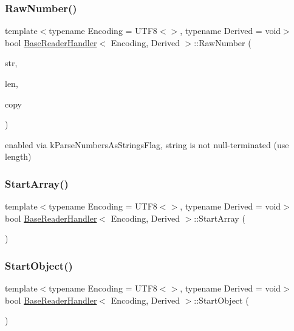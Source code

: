 \subsubsection{\texorpdfstring{Raw\+Number()}{RawNumber()}}
{\footnotesize\ttfamily template$<$typename Encoding = U\+T\+F8$<$$>$, typename Derived = void$>$ \\
bool \hyperlink{structBaseReaderHandler}{Base\+Reader\+Handler}$<$ Encoding, Derived $>$\+::Raw\+Number (\begin{DoxyParamCaption}\item[{const \hyperlink{structBaseReaderHandler_a8302c755dd3560c8c5bac99162c28214}{Ch} $\ast$}]{str,  }\item[{\hyperlink{rapidjson_8h_a5ed6e6e67250fadbd041127e6386dcb5}{Size\+Type}}]{len,  }\item[{bool}]{copy }\end{DoxyParamCaption})\hspace{0.3cm}{\ttfamily [inline]}}



enabled via k\+Parse\+Numbers\+As\+Strings\+Flag, string is not null-\/terminated (use length) 

\mbox{\label{structBaseReaderHandler_a9dbb1143a250a904bb18a174553a3a00}} 
\subsubsection{\texorpdfstring{Start\+Array()}{StartArray()}}
{\footnotesize\ttfamily template$<$typename Encoding = U\+T\+F8$<$$>$, typename Derived = void$>$ \\
bool \hyperlink{structBaseReaderHandler}{Base\+Reader\+Handler}$<$ Encoding, Derived $>$\+::Start\+Array (\begin{DoxyParamCaption}{ }\end{DoxyParamCaption})\hspace{0.3cm}{\ttfamily [inline]}}

\mbox{\label{structBaseReaderHandler_ab0a7d9bcececb8d6ed748656f67f4917}} 
\subsubsection{\texorpdfstring{Start\+Object()}{StartObject()}}
{\footnotesize\ttfamily template$<$typename Encoding = U\+T\+F8$<$$>$, typename Derived = void$>$ \\
bool \hyperlink{structBaseReaderHandler}{Base\+Reader\+Handler}$<$ Encoding, Derived $>$\+::Start\+Object (\begin{DoxyParamCaption}{ }\end{DoxyParamCaption})\hspace{0.3cm}{\ttfamily [inline]}}


